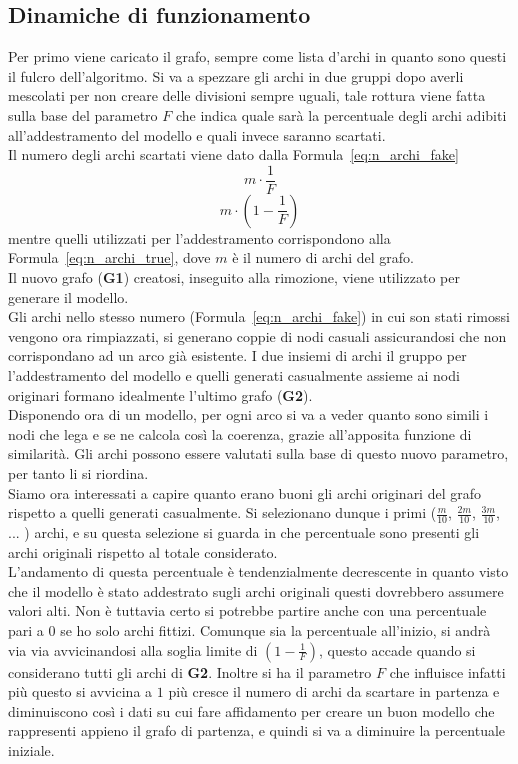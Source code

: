\subsection{Dinamiche di funzionamento}
Per primo viene caricato il grafo, sempre come lista d'archi in quanto sono questi il fulcro dell'algoritmo. Si va a spezzare gli archi in due gruppi dopo averli mescolati per non creare delle divisioni sempre uguali, tale rottura viene fatta sulla base del parametro $F$ che indica quale sarà la percentuale degli archi adibiti all'addestramento del modello e quali invece saranno scartati.\\
Il numero degli archi scartati viene dato dalla Formula~\ref{eq:n_archi_fake}
\begin{equation}
	m \cdot \frac{1}{F}
	\label{eq:n_archi_fake}
\end{equation} 
\begin{equation}
	m \cdot \left( 1- \frac{1}{F} \right)
	\label{eq:n_archi_true}
\end{equation}
mentre quelli utilizzati per l'addestramento corrispondono alla Formula~\ref{eq:n_archi_true}, dove $m$ è il numero di archi del grafo.\\
Il nuovo grafo (\textbf{G1}) creatosi, inseguito alla rimozione, viene utilizzato per generare il modello.\\
Gli archi nello stesso numero (Formula~\ref{eq:n_archi_fake}) in cui son stati rimossi vengono ora rimpiazzati, si generano coppie di nodi casuali assicurandosi che non corrispondano ad un arco già esistente. I due insiemi di archi il gruppo per l'addestramento del modello e quelli generati casualmente assieme ai nodi originari formano idealmente l'ultimo grafo (\textbf{G2}).\\
Disponendo ora di un modello, per ogni arco si va a veder quanto sono simili i nodi che lega e se ne calcola così la coerenza, grazie all'apposita funzione di similarità. Gli archi possono essere valutati sulla base di questo nuovo parametro, per tanto li si riordina.\\
Siamo ora interessati a capire quanto erano buoni gli archi originari del grafo rispetto a quelli generati casualmente. Si selezionano dunque i primi ($\displaystyle \frac{m}{10}$, $\displaystyle \frac{2m}{10}$, $\displaystyle \frac{3m}{10}$, ... ) archi, e su questa selezione si guarda in che percentuale sono presenti gli archi originali rispetto al totale considerato.\\
L'andamento di questa percentuale è tendenzialmente decrescente in quanto visto che il modello è stato addestrato sugli archi originali questi dovrebbero assumere valori alti. Non è tuttavia certo si potrebbe partire anche con una percentuale pari a $0$ se ho solo archi fittizi. Comunque sia la percentuale all'inizio, si andrà via via avvicinandosi alla soglia limite di $\displaystyle \left( 1- \frac{1}{F} \right)$, questo accade quando si considerano tutti gli archi di \textbf{G2}. Inoltre si ha il parametro $F$ che influisce infatti più questo si avvicina a $1$ più cresce il numero di archi da scartare in partenza e diminuiscono così i dati su cui fare affidamento per creare un buon modello che rappresenti appieno il grafo di partenza, e quindi si va a diminuire la percentuale iniziale.\\
